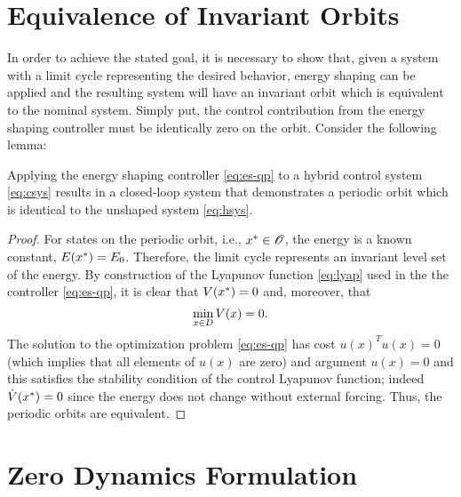 \documentclass[twocolumn]{article}
\begin{document}
\section{Equivalence of Invariant Orbits}

In order to achieve the stated goal, it is necessary to show that, given a system with a limit cycle representing the desired behavior, energy shaping can be applied and the resulting system will have an invariant orbit which is equivalent to the nominal system. Simply put, the control contribution from the energy shaping controller must be identically zero on the orbit. Consider the following lemma:

\begin{lemma}
  Applying the energy shaping controller \eqref{eq:es-qp} to a hybrid control system \eqref{eq:csys} results in a closed-loop system that demonstrates a periodic orbit which is identical to the unshaped system \eqref{eq:hsys}.
\end{lemma}

\begin{proof}
  For states on the periodic orbit, i.e., $x^{*} \in \mathscr{O}$, the energy is a known constant, $E(x^{*}) = E_{0}$.
  Therefore, the limit cycle represents an invariant level set of the energy.
  By construction of the Lyapunov function \eqref{eq:lyap} used in the the controller \eqref{eq:es-qp}, it is clear that $V(x^{*}) = 0$ and, moreover, that $$\min_{x \in D} V(x) = 0.$$
  The solution to the optimization problem \eqref{eq:es-qp} has cost $u(x)^T u(x) = 0$ (which implies that all elements of $u(x)$ are zero) and argument $u(x) = 0$ and this satisfies the stability condition of the control Lyapunov function; indeed ${\dot V}(x^{*}) = 0$ since the energy does not change without external forcing.
  Thus, the periodic orbits are equivalent.
\end{proof}

\section{Zero Dynamics Formulation}
\end{document}
